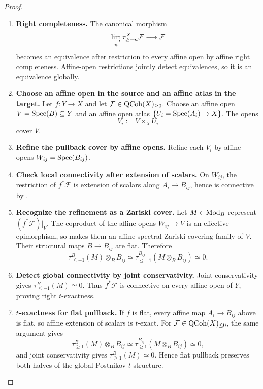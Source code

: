 \begin{proof}
\begin{enumerate}[label=\textup{(\arabic*)}]
    \item \textbf{Right completeness.}
    The canonical morphism
    \[
        \varinjlim_n\tau_{\geq-n}^{X}\mathcal F
        \longrightarrow
        \mathcal F
    \]
    becomes an equivalence after restriction to every affine open by affine
    right completeness. Affine-open restrictions jointly detect
    equivalences, so it is an equivalence globally.

    \item \textbf{Choose an affine open in the source and an affine atlas in the target.}
    Let \(f:Y\to X\) and let
    \(\mathcal F\in\operatorname{QCoh}(X)_{\geq0}\). Choose an affine open
    \(V=\operatorname{Spec}(B)\subseteq Y\) and an affine open atlas
    \(\{U_i=\operatorname{Spec}(A_i)\to X\}\). The opens
    \[
        V_i:=V\times_XU_i
    \]
    cover \(V\).

    \item \textbf{Refine the pullback cover by affine opens.}
    Refine each \(V_i\) by affine opens
    \(W_{ij}=\operatorname{Spec}(B_{ij})\).

    \item \textbf{Check local connectivity after extension of scalars.}
    On \(W_{ij}\), the restriction of
    \(f^*\mathcal F\) is extension of scalars along
    \(A_i\to B_{ij}\), hence is connective by
    .

    \item \textbf{Recognize the refinement as a Zariski cover.}
    Let \(M\in\operatorname{Mod}_B\) represent \((f^*\mathcal F)|_V\). The coproduct
    of the affine opens \(W_{ij}\to V\) is an effective epimorphism, so
     makes them an affine spectral
    Zariski covering family of \(V\). Their structural maps
    \(B\to B_{ij}\) are flat. Therefore
    \[
        \tau_{\leq-1}^{B}(M)\otimes_BB_{ij}
        \simeq
        \tau_{\leq-1}^{B_{ij}}(M\otimes_BB_{ij})
        \simeq0.
    \]

    \item \textbf{Detect global connectivity by joint conservativity.}
    Joint conservativity gives \(\tau_{\leq-1}^{B}(M)\simeq0\). Thus
    \(f^*\mathcal F\) is connective on every affine open of \(Y\), proving
    right \(t\)-exactness.

    \item \textbf{$t$-exactness for flat pullback.}
    If \(f\) is flat, every affine map \(A_i\to B_{ij}\) above is flat, so
    affine extension of scalars is \(t\)-exact. For
    \(\mathcal F\in\operatorname{QCoh}(X)_{\leq0}\), the same argument gives
    \[
        \tau_{\geq1}^{B}(M)\otimes_BB_{ij}
        \simeq
        \tau_{\geq1}^{B_{ij}}(M\otimes_BB_{ij})
        \simeq0,
    \]
    and joint conservativity gives \(\tau_{\geq1}^{B}(M)\simeq0\). Hence flat
    pullback preserves both halves of the global Postnikov \(t\)-structure.
\end{enumerate}
\end{proof}

